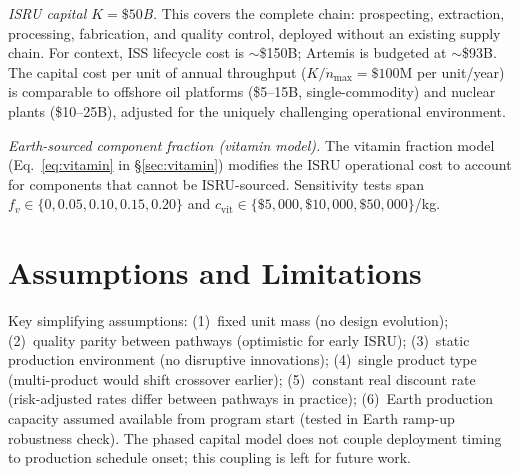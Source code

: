 \documentclass[preprint,12pt]{elsarticle}
\begin{document}
\emph{ISRU capital $K = \$50$B.} This covers the complete chain: prospecting, extraction, processing, fabrication, and quality control, deployed without an existing supply chain. For context, ISS lifecycle cost is $\sim$\$150B; Artemis is budgeted at $\sim$\$93B. The capital cost per unit of annual throughput ($K/\dot{n}_{\max} = \$100$M per unit/year) is comparable to offshore oil platforms (\$5--15B, single-commodity) and nuclear plants (\$10--25B), adjusted for the uniquely challenging operational environment.

\emph{Earth-sourced component fraction (vitamin model).} The vitamin fraction model (Eq.~\ref{eq:vitamin} in \S\ref{sec:vitamin}) modifies the ISRU operational cost to account for components that cannot be ISRU-sourced. Sensitivity tests span $f_v \in \{0, 0.05, 0.10, 0.15, 0.20\}$ and $c_{\mathrm{vit}} \in \{\$5{,}000, \$10{,}000, \$50{,}000\}$/kg.

\section{Assumptions and Limitations}
\label{sec:appendix_assumptions}

Key simplifying assumptions: (1)~fixed unit mass (no design evolution); (2)~quality parity between pathways (optimistic for early ISRU); (3)~static production environment (no disruptive innovations); (4)~single product type (multi-product would shift crossover earlier); (5)~constant real discount rate (risk-adjusted rates differ between pathways in practice); (6)~Earth production capacity assumed available from program start (tested in Earth ramp-up robustness check). The phased capital model does not couple deployment timing to production schedule onset; this coupling is left for future work.
\end{document}
